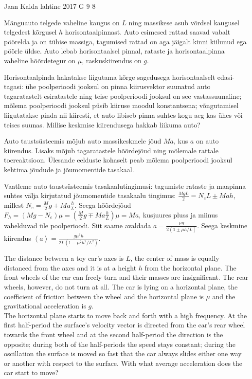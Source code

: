 {Jaan Kalda} %
{lahtine} %
{2017} %
{G 9} %
{8} %
{
\ifStatement
Mänguauto telgede vaheline kaugus on $L$ ning massikese asub võrdsel kaugusel telgedest kõrgusel $h$ horisontaalpinnast. Auto esimesed rattad saavad vabalt pöörelda ja on tühise massiga, tagumised rattad on aga jäigalt kinni kiilunud ega pöörle üldse. Auto lebab horisontaalsel pinnal, rataste ja horisontaalpinna vaheline hõõrdetegur on $\mu$, raskuskiirendus on $g$.

Horisontaalpinda hakatakse liigutama kõrge sagedusega horisontaalselt edasi-tagasi: ühe poolperioodi jooksul on pinna kiirusvektor suunatud auto tagaratastelt esiratastele ning teise poolperioodi jooksul on see vastassuunaline; mõlema poolperioodi jooksul püsib kiiruse moodul konstantsena; võngutamisel liigutatakse pinda nii kiiresti, et auto libiseb pinna suhtes kogu aeg kas ühes või teises suunas. Millise keskmise kiirendusega hakkab liikuma auto?
\fi


\ifHint
Auto taustsüsteemis mõjub auto massikeskmele jõud $Ma$, kus $a$ on auto kiirendus. Lisaks mõjub tagaratastele hõõrdejõud ning mõlemale rattale toereaktsioon. Ülesande eelduste kohaselt peab mõlema poolperioodi jooksul kehtima jõudude ja jõumomentide tasakaal.
\fi


\ifSolution
Vaatleme auto taustsüsteemis tasakaalutingimusi: tagumiste rataste ja maapinna suhtes välja kirjutatud jõumomentide tasakaalu tingimus: $\frac {MgL}2=N_eL\pm Mah$, millest $N_e=\frac M2g\pm Ma\frac hL$. Seega hõõrdejõud $F_h=(Mg-N_e)\mu=(\frac M2g\mp Ma\frac hL)\mu=Ma$, kusjuures pluss ja miinus vahelduvad üle poolperioodi. Siit saame avaldada $a=\frac{\mu g}{2(1\pm \mu h/L)}$. Seega keskmine kiirendus $\left< a\right>=\frac{g\mu^2h}{2L(1-\mu^2h^2/L^2)}.$
\fi


\ifEngStatement
The distance between a toy car’s axes is $L$, the center of mass is equally distanced from the axes and it is at a height $h$ from the horizontal plane. The front wheels of the car can freely turn and their masses are insignificant. The rear wheels, however, do not turn at all. The car is lying on a horizontal plane, the coefficient of friction between the wheel and the horizontal plane is $\mu$ and the gravitational acceleration is $g$.\\
The horizontal plane starts to move back and forth with a high frequency. At the first half-period the surface’s velocity vector is directed from the car’s rear wheel towards the front wheel and at the second half-period the direction is the opposite; during both of the half-periods the speed stays constant; during the oscillation the surface is moved so fast that the car always slides either one way or another with respect to the surface. With what average acceleration does the car start to move?
\fi


}
